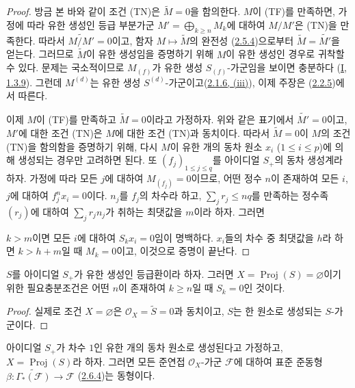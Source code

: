 \begin{proof}
방금 본 바와 같이 조건 (TN)은 $\widetilde{M}=0$을 함의한다. $M$이
(TF)를 만족하면, 가정에 따라 유한 생성인 등급 부분가군
$M'=\bigoplus_{k\geq n}M_k$에 대하여 $M/M'$은 (TN)을 만족한다. 따라서
$\widetilde{M/M'}=0$이고, 함자 $M\mapsto\widetilde{M}$의 완전성
(\hyperref[II.2.5.4-ko]{2.5.4})으로부터
$\widetilde{M}=\widetilde{M'}$을 얻는다. 그러므로 $\widetilde{M}$이 유한
생성임을 증명하기 위해 $M$이 유한 생성인 경우로 귀착할 수 있다. 문제는
국소적이므로 $M_{(f)}$가 유한 생성 $S_{(f)}$-가군임을 보이면 충분하다
(\hyperref[I.1.3.9-ko]{I, 1.3.9}). 그런데 $M^{(d)}$는 유한 생성
$S^{(d)}$-가군이고(\hyperref[II.2.1.6-ko]{2.1.6, (iii)}), 이제 주장은
(\hyperref[II.2.2.5-ko]{2.2.5})에서 따른다.

이제 $M$이 (TF)를 만족하고 $\widetilde{M}=0$이라고 가정하자. 위와 같은
표기에서 $\widetilde{M'}=0$이고, $M'$에 대한 조건 (TN)은 $M$에 대한
조건 (TN)과 동치이다. 따라서 $\widetilde{M}=0$이 $M$의 조건 (TN)을
함의함을 증명하기 위해, 다시 $M$이 유한 개의 동차 원소 $x_i$
($1\leq i\leq p$)에 의해 생성되는 경우만 고려하면 된다. 또
$(f_j)_{1\leq j\leq q}$를 아이디얼 $S_+$의 동차 생성계라 하자. 가정에
따라 모든 $j$에 대하여 $M_{(f_j)}=0$이므로, 어떤 정수 $n$이 존재하여
모든 $i$, $j$에 대하여 $f_j^nx_i=0$이다. $n_j$를 $f_j$의 차수라 하고,
$\sum_jr_j\leq nq$를 만족하는 정수족 $(r_j)$에 대하여
$\sum_jr_jn_j$가 취하는 최댓값을 $m$이라 하자. 그러면

$k>m$이면 모든 $i$에 대하여 $S_kx_i=0$임이 명백하다. $x_i$들의 차수 중
최댓값을 $h$라 하면 $k>h+m$일 때 $M_k=0$이고, 이것으로 증명이 끝난다.
\end{proof}

\begin{corollary}[2.7.4]
\label{II.2.7.4-ko}
$S$를 아이디얼 $S_+$가 유한 생성인 등급환이라 하자. 그러면
$X=\operatorname{Proj}(S)=\varnothing$이기 위한 필요충분조건은 어떤 $n$이
존재하여 $k\geq n$일 때 $S_k=0$인 것이다.
\end{corollary}

\begin{proof}
실제로 조건 $X=\varnothing$은
$\mathcal{O}_X=\widetilde{S}=0$과 동치이고, $S$는 한 원소로 생성되는
$S$-가군이다.
\end{proof}

\begin{theorem}[2.7.5]
\label{II.2.7.5-ko}
아이디얼 $S_+$가 차수 $1$인 유한 개의 동차 원소로 생성된다고 가정하고,
$X=\operatorname{Proj}(S)$라 하자. 그러면 모든 준연접
$\mathcal{O}_X$-가군 $\mathcal{F}$에 대하여 표준 준동형
$\beta:\widetilde{\Gamma_*(\mathcal{F})}
\to\mathcal{F}$ (\hyperref[II.2.6.4-ko]{2.6.4})는 동형이다.
\end{theorem}

